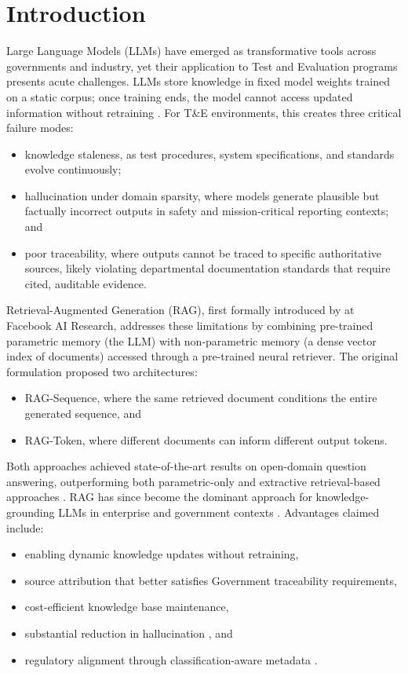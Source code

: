 \documentclass[12pt,letterpaper]{article}
\let\cite\parencite
\begin{document}
\section{Introduction}

Large Language Models (LLMs) have emerged as transformative tools across governments and industry, yet their application to Test and Evaluation programs presents acute challenges. LLMs store knowledge in fixed model weights trained on a static corpus; once training ends, the model cannot access updated information without retraining \cite{lewis2020,gao2023}. For T\&E environments, this creates three critical failure modes:
\begin{itemize}
\item knowledge staleness, as test procedures, system specifications, and standards evolve continuously;
\item hallucination under domain sparsity, where models generate plausible but factually incorrect outputs in safety and mission-critical reporting contexts; and
\item poor traceability, where outputs cannot be traced to specific authoritative sources, likely violating departmental documentation standards that require cited, auditable evidence.
\end{itemize}

Retrieval-Augmented Generation (RAG), first formally introduced by \textcite{lewis2020} at Facebook AI Research, addresses these limitations by combining pre-trained parametric memory (the LLM) with non-parametric memory (a dense vector index of documents) accessed through a pre-trained neural retriever. The original formulation proposed two architectures:
\begin{itemize}
\item RAG-Sequence, where the same retrieved document conditions the entire generated sequence, and
\item RAG-Token, where different documents can inform different output tokens.
\end{itemize}

Both approaches achieved state-of-the-art results on open-domain question answering, outperforming both parametric-only and extractive retrieval-based approaches \cite{lewis2020}. RAG has since become the dominant approach for knowledge-grounding LLMs in enterprise and government contexts \cite{kaddour2023,mdpi2025}. Advantages claimed include:
\begin{itemize}
\item enabling dynamic knowledge updates without retraining,
\item source attribution that better satisfies Government traceability requirements,
\item cost-efficient knowledge base maintenance,
\item substantial reduction in hallucination \cite{gao2023}, and
\item regulatory alignment through classification-aware metadata \cite{aws2025,ibm2025}.
\end{itemize}
\end{document}
